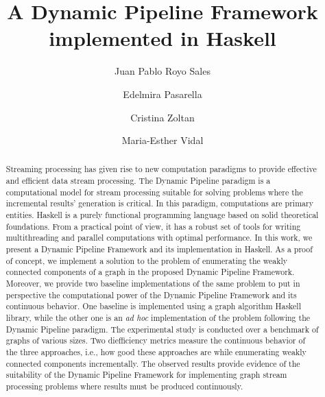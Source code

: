 \documentclass[preprint]{elsarticle}
\begin{document}
\title{A Dynamic Pipeline Framework implemented in Haskell}

%
\author[1]{Juan Pablo Royo Sales}

\author[1]{Edelmira Pasarella}

\author[1]{Cristina Zoltan}

\author[2,3,4]{Maria-Esther Vidal}






\begin{abstract}
Streaming processing has given rise to new computation paradigms to provide effective and efficient data stream processing. 
The Dynamic Pipeline paradigm is a computational model for stream processing suitable for solving problems where the incremental results' generation is critical. In this paradigm, computations are primary entities. Haskell is a purely functional programming language based on solid theoretical foundations. From a practical point of view, it has a robust set of tools for writing multithreading and parallel computations with optimal performance. In this work, we present a Dynamic Pipeline Framework and its implementation in Haskell. 
As a proof of concept, we implement a solution to the problem of enumerating the weakly connected components of a graph in the proposed Dynamic Pipeline Framework. Moreover, we provide two baseline implementations of the same problem to put in perspective the computational power of the Dynamic Pipeline Framework and its continuous behavior. One baseline is implemented using a graph algorithm Haskell library, while the other one is an \textit{ad hoc} implementation of the problem following the Dynamic Pipeline paradigm.
The experimental study is conducted over a benchmark of graphs of various sizes. 
Two diefficiency metrics measure the continuous behavior of the three approaches, i.e., how good these approaches are while enumerating weakly connected components incrementally. The observed results provide evidence of the suitability of the Dynamic Pipeline Framework for implementing graph stream processing problems where results must be produced continuously. 
\end{abstract}
\end{document}
